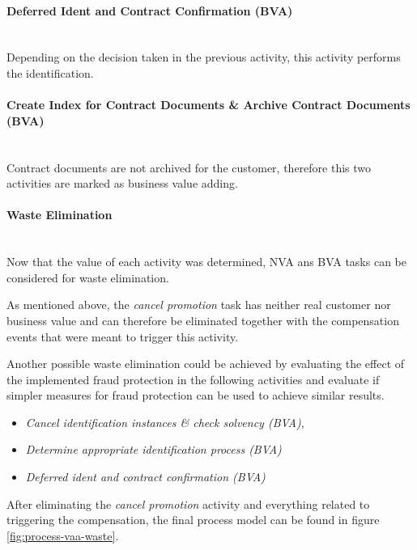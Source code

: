 \paragraph{Deferred Ident and Contract Confirmation (BVA)}~\\ 
 Depending on the decision taken in the previous activity, this activity performs the identification. 
\paragraph{Create Index for Contract Documents \& Archive Contract Documents (BVA)}~\\ 
Contract documents are not archived for the customer, therefore this two activities are marked as business value adding.

\paragraph{Waste Elimination}~\\
Now that the value of each activity was determined, NVA ans BVA tasks can be considered for waste elimination.

As mentioned above, the \textit{cancel promotion} task has neither real customer nor business value and can therefore be eliminated together with the compensation events that were meant to trigger this activity. 

Another possible waste elimination could be achieved by evaluating the effect of the implemented fraud protection in the following activities and evaluate if simpler measures for fraud protection can be used to achieve similar results.
\begin{itemize}
	\item \textit{Cancel identification  instances \& check solvency (BVA)}, 
	\item \textit{{Determine appropriate identification process (BVA)}} 
	\item \textit{Deferred ident and contract confirmation (BVA)}
\end{itemize}

After eliminating the \textit{cancel promotion} activity and everything related to triggering the compensation, the final process model can be found in figure \ref{fig:process-vaa-waste}.

